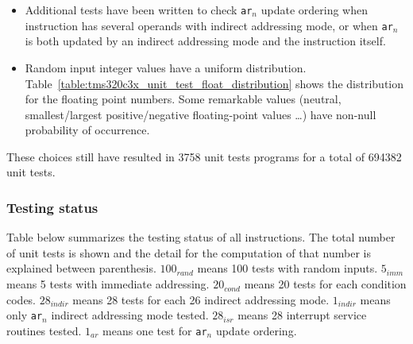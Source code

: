 \begin{itemize}
\item Additional tests have been written to check \texttt{ar$_n$} update ordering when instruction has several operands with indirect addressing mode, or when \texttt{ar$_n$} is both updated by an indirect addressing mode and the instruction itself.
\item Random input integer values have a uniform distribution. Table~\ref{table:tms320c3x_unit_test_float_distribution} shows the distribution for the floating point numbers. Some remarkable values (neutral, smallest/largest positive/negative floating-point values \ldots) have non-null probability of occurrence.
\end{itemize}

These choices still have resulted in 3758 unit tests programs for a total of 694382 unit tests.

\subsubsection{Testing status}
\label{tms320c3x_testing_status}

\noindent Table below summarizes the testing status of all instructions. The total number of unit tests is shown and the detail for the computation of that number is explained between parenthesis. $100_{rand}$ means 100 tests with random inputs. $5_{imm}$ means 5 tests with immediate addressing. $20_{cond}$ means 20 tests for each condition codes. $28_{indir}$ means 28 tests for each 26 indirect addressing mode. $1_{indir}$ means only \texttt{ar$_n$} indirect addressing mode tested. $28_{isr}$ means 28 interrupt service routines tested. $1_{ar}$ means one test for \texttt{ar$_n$} update ordering.

\newpage

